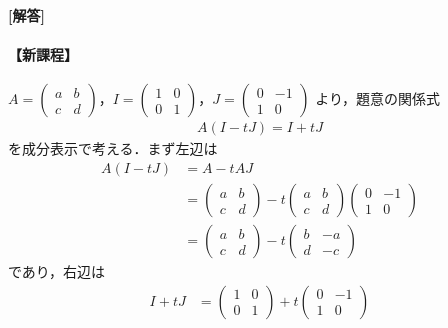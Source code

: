 \documentclass[../../main.tex]{subfiles}
\begin{document}
\begin{oframed}
  
\end{oframed}

{\bf [解答]}
\paragraph{【新課程】}

$A=
\begin{pmatrix} a & b \\ c & d
\end{pmatrix}$，$I=
\begin{pmatrix} 1 & 0 \\ 0 & 1
\end{pmatrix}$，$J=
\begin{pmatrix} 0 & -1 \\ 1 & 0
\end{pmatrix}$ より，題意の関係式
\begin{align}
  A(I-tJ) = I + tJ \label{eq:1}
\end{align}
を成分表示で考える．まず左辺は
\begin{align}
  A(I-tJ) &= A - tAJ \nonumber\\
  &=
  \begin{pmatrix} a & b \\ c & d
  \end{pmatrix} - t
  \begin{pmatrix} a & b \\ c & d
  \end{pmatrix}
  \begin{pmatrix} 0 & -1 \\ 1 & 0
  \end{pmatrix} \nonumber\\
  &=
  \begin{pmatrix} a & b \\ c & d
  \end{pmatrix} - t
  \begin{pmatrix} b & -a \\ d & -c
  \end{pmatrix} \label{eq:2}
\end{align}
であり，右辺は
\begin{align}
  I+tJ &=
  \begin{pmatrix} 1 & 0 \\ 0 & 1
  \end{pmatrix} + t
  \begin{pmatrix} 0 & -1 \\ 1 & 0
  \end{pmatrix} \label{eq:3}
\end{align}
\end{document}
